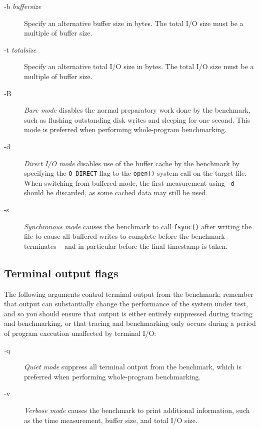 \documentclass[a4paper,10pt]{article}
\begin{document}
\begin{description}
\item[-b \textit{buffersize}] Specify an alternative buffer size in bytes.
  The total I/O size must be a multiple of buffer size.

\item[-t \textit{totalsize}] Specify an alternative total I/O size in bytes.
  The total I/O size must be a multiple of buffer size.

\item[-B] \textit{Bare mode} disables the normal preparatory work done by the
  benchmark, such as flushing outstanding disk writes and sleeping for one
  second.
  This mode is preferred when performing whole-program benchmarking.

\item[-d] \textit{Direct I/O mode} disables use of the buffer cache by the
  benchmark by specifying the \texttt{O\_DIRECT} flag to the \texttt{open()}
  system call on the target file.
  When switching from buffered mode, the first measurement using \texttt{-d}
  should be discarded, as some cached data may still be used.

\item[-s] \textit{Synchronous mode} causes the benchmark to call
  \texttt{fsync()} after writing the file to cause all buffered writes to
  complete before the benchmark terminates -- and in particular before the
  final timestamp is taken.
\end{description}

\subsection*{Terminal output flags}

\noindent
The following arguments control terminal output from the benchmark; remember
that output can substantially change the performance of the system under test,
and so you should ensure that output is either entirely suppressed during
tracing and benchmarking, or that tracing and benchmarking only occurs during
a period of program execution unaffected by terminal I/O:

\begin{description}
\item[-q] \textit{Quiet mode} suppress all terminal output from the benchmark,
  which is preferred when performing whole-program benchmarking.

\item[-v] \textit{Verbose mode} causes the benchmark to print additional
  information, such as the time measurement, buffer size, and total I/O size.
\end{description}
\end{document}
